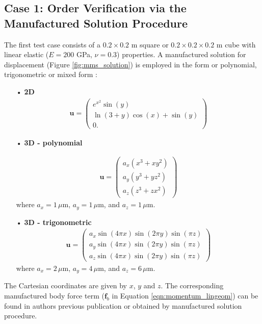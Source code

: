 \documentclass[sn-mathphys,Numbered]{sn-jnl}%
\newcommand{\bb}{\boldsymbol}
\begin{document}
%
\subsection{Case 1: Order Verification via the Manufactured Solution Procedure}
\label{case:mms}
%
The first test case consists of a  $0.2 \times 0.2$ m square or $0.2 \times 0.2 \times 0.2$ m cube with linear elastic ($E = 200$ GPa, $\nu = 0.3$) properties.
A manufactured solution for displacement (Figure \ref{fig:mms_solution}) is employed in the form or polynomial, trigonometric \citep{Mazzanti2024} or mixed form \citep{Castrillo2022}:
\begin{itemize}
\item[•] \textbf{2D} 
\begin{eqnarray}
	\bb{u} =
	\begin{pmatrix}
 e^{x^2}\sin(y)\\
\ln(3+y)\cos(x)+\sin(y)\\
 0.
	\end{pmatrix}
\end{eqnarray}
\item[•] \textbf{3D - polynomial}

\begin{eqnarray}
	\bb{u} =
	\begin{pmatrix}
	a_x(x^3 + xy^2) \\
	a_y(y^3 + yz^2) \\
	a_z(z^3 + zx^2)
	\end{pmatrix}
\end{eqnarray}
where $a_x = 1\,\mu$m, $a_y = 1\,\mu$m, and $a_z = 1\,\mu$m.
\item[•] \textbf{3D - trigonometric}
 \begin{eqnarray}
	\bb{u} =
	\begin{pmatrix}
	a_x \sin(4\pi x) \sin(2\pi y) \sin(\pi z) \\
	a_y \sin(4 \pi x) \sin(2 \pi y) \sin(\pi z) \\
	a_z \sin(4 \pi x) \sin(2 \pi y) \sin(\pi z) 
	\end{pmatrix}
\end{eqnarray}
where $a_x = 2\,\mu$m, $a_y = 4\,\mu$m, and $a_z = 6\,\mu$m.
\end{itemize}
The Cartesian coordinates are given by $x$, $y$ and $z$.
The corresponding manufactured body force term ($\bb{f}_b$ in Equation \ref{eqn:momentum_lingeom}) can be found in authors previous publication \citep{Cardiff2025} or obtained by manufactured solution procedure.
\end{document}
